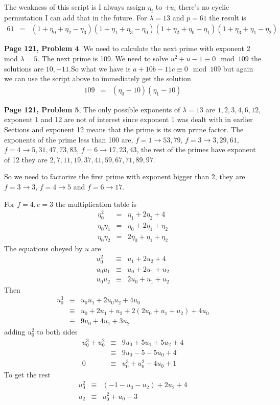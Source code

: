 \documentclass[aps,preprint,preprintnumbers,nofootinbib,showpacs,prd]{revtex4-1}
\newcommand{\nbea}{\begin{eqnarray*}}
\newcommand{\neea}{\end{eqnarray*}}
\begin{document}
%
The weakness of this script is I always assign $\eta_i$ to $\pm u_i$ there's no cyclic permutation I can add that in the future. For  $\lambda = 13$ and $p = 61$ the result is
%
\nbea
61 & = & (1 + \eta_0 + \eta_2 - \eta_3)(1 + \eta_1 + \eta_3 - \eta_0)(1 + \eta_2 + \eta_0 - \eta_1)(1 + \eta_3 + \eta_1 - \eta_2)
\neea
%

{\bf Page 121, Problem 4}. We need to calculate the next prime with exponent 2 mod $\lambda=5$. The next prime is 109. We need to solve $u^2 + u - 1 \equiv 0 \mod{109}$ the solutions are $10, -11$.So what we have is $a + 10b - 11c \equiv 0 \mod{109}$ but again we can use the script above to immediately get the solution
%
\nbea
109 & = & (\eta_0 - 10)(\eta_1 - 10)
\neea
%

{\bf Page 121, Problem 5}, The only possible exponents of $\lambda = 13$ are $1,2,3,4,6,12$, exponent 1 and 12 are not of interest since exponent 1 was dealt with in earlier Sections and exponent 12 means that the prime is its own prime factor. The exponents of the prime less than 100 are, $f = 1 \to 53, 79$, $f = 3 \to 3, 29, 61$, $f = 4 \to 5, 31, 47, 73, 83$, $f = 6 \to 17, 23, 43$, the rest of the primes have exponent of 12 they are $2, 7, 11, 19, 37, 41, 59, 67, 71, 89, 97$.

So we need to factorize the first prime with exponent bigger than 2, they are $f = 3 \to 3$, $f = 4 \to 5$ and $f = 6 \to 17$.

For $f = 4, e = 3$ the multiplication table is
%
\nbea
\eta_0^2 & = & \eta_1 + 2\eta_2 + 4 \\
\eta_0\eta_1 & = & \eta_0 + 2\eta_1 + \eta_2 \\
\eta_0\eta_2 & = & 2\eta_0 + \eta_1 + \eta_2
\neea
%
The equations obeyed by $u$ are
%
\nbea
u_0^2 & \equiv & u_1 + 2u_2 + 4 \\
u_0u_1 & \equiv & u_0 + 2u_1 + u_2 \\
u_0u_2 & \equiv & 2u_0 + u_1 + u_2
\neea
%
Then
%
\nbea
u_0^3 & \equiv & u_0u_1 + 2u_0u_2 + 4u_0 \\
& \equiv & u_0 + 2u_1 + u_2 + 2(2u_0 + u_1 + u_2) + 4u_0 \\
& \equiv & 9u_0 + 4u_1 + 3u_2
\neea
%
adding $u_0^2$ to both sides
%
\nbea
u_0^3 + u_0^2 & \equiv & 9u_0 + 5u_1 + 5u_2 + 4 \\
& \equiv & 9u_0 - 5 - 5 u_0 + 4 \\
0 & \equiv & u_0^3 + u_0^2  - 4u_0 + 1
\neea
%
To get the rest
%
\nbea
u_0^2 & \equiv & (-1 - u_0 - u_2) + 2u_2 + 4 \\
u_2 & \equiv & u_0^2 + u_0 - 3
\neea
%
\end{document}
